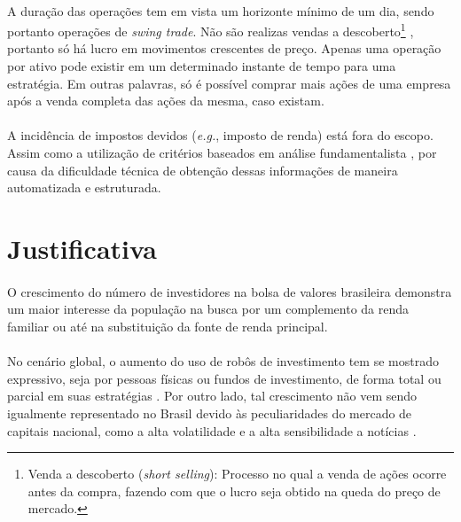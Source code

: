 \paragraph{} A duração das operações tem em vista um horizonte mínimo de um dia, sendo portanto operações de \textit{swing trade}. Não são realizas vendas a descoberto\footnote{Venda a descoberto (\textit{short selling}): Processo no qual a venda de ações ocorre antes da compra, fazendo com que o lucro seja obtido na queda do preço de mercado.} \cite{reed2013short}, portanto só há lucro em movimentos crescentes de preço. Apenas uma operação por ativo pode existir em um determinado instante de tempo para uma estratégia. Em outras palavras, só é possível comprar mais ações de uma empresa após a venda completa das ações da mesma, caso existam.

\paragraph{} A incidência de impostos devidos (\textit{e.g.}, imposto de renda) está fora do escopo. Assim como a utilização de critérios baseados em análise fundamentalista \cite{bulkowski2012fundamental}, por causa da dificuldade técnica de obtenção dessas informações de maneira automatizada e estruturada.



\FloatBarrier
\section{Justificativa}

\paragraph{} O crescimento do número de investidores na bolsa de valores brasileira \cite{aumento_investidores} demonstra um maior interesse da população na busca por um complemento da renda familiar ou até na substituição da fonte de renda principal.

\paragraph{} No cenário global, o aumento do uso de robôs de investimento tem se mostrado expressivo, seja por pessoas físicas ou fundos de investimento, de forma total ou parcial em suas estratégias \cite{robos_investidores, investing_robot}. Por outro lado, tal crescimento não vem sendo igualmente representado no Brasil devido às peculiaridades do mercado de capitais nacional, como a alta volatilidade e a alta sensibilidade a notícias \cite{robos_e_fundos}.


